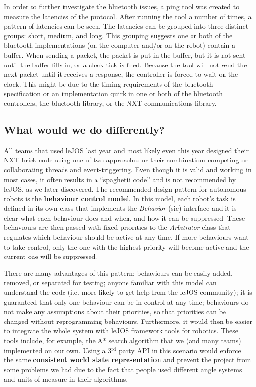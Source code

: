In order to further investigate the bluetooth issues, a ping tool was created
to measure the latencies of the protocol.  After running the tool a number of
times, a pattern of latencies can be seen. The latencies can be grouped into
three distinct groups: short, medium, and long. This grouping suggests one or
both of the bluetooth implementations (on the computer and/or on the robot)
contain a buffer. When sending a packet, the packet is put in the buffer, but
it is not sent until the buffer fills in, or a clock tick is fired. Because the
tool will not send the next packet until it receives a response, the controller
is forced to wait on the clock. This might be due to the timing requirements of
the bluetooth specification or an implementation quirk in one or both of the
bluetooth controllers, the bluetooth library, or the NXT communications
library.

\subsection{What would we do differently?}
All teams that used leJOS last year and most likely even this year designed
their NXT brick code using one of two approaches or their combination:
competing or collaborating threads and event-triggering. Even though it is
valid and working in most cases, it often results in a ``spaghetti code'' and
is not recommended by leJOS, as we later discovered. The recommended design
pattern for autonomous robots is the \textbf{behaviour control
model}\cite{behaviour}. In this model, each robot's task is defined in its own
class that implements the \textsl{Behavior} (sic) interface and it is clear
what each behaviour does and when, and how it can be suppressed. These
behaviours are then passed with fixed priorities to the \textsl{Arbitrator}
class that regulates which behaviour should be active at any time. If more
behaviours want to take control, only the one with the highest priority will
become active and the current one will be suppressed.

There are many advantages of this pattern: behaviours can be easily added,
removed, or separated for testing; anyone familiar with this model can
understand the code (i.e. more likely to get help from the leJOS community); it
is guaranteed that only one behaviour can be in control at any time; behaviours
do not make any assumptions about their priorities, so that priorities can be
changed without reprogramming behaviours. Furthermore, it would then be easier
to integrate the whole system with leJOS framework tools for robotics. These
tools include, for example, the A* search algorithm that we (and many teams)
implemented on our own.  Using a 3$^{\textrm{rd}}$ party API in this scenario
would enforce the same \textbf{consistent world state representation} and
prevent the project from some problems we had due to the fact that people used
different angle systems and units of measure in their algorithms.
